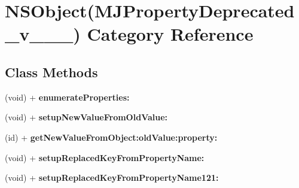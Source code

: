 \hypertarget{category_n_s_object_07_m_j_property_deprecated__v__2__5__16_08}{}\section{N\+S\+Object(M\+J\+Property\+Deprecated\+\_\+v\+\_\+\_\+\_) Category Reference}
\label{category_n_s_object_07_m_j_property_deprecated__v__2__5__16_08}
\subsection*{Class Methods}
\begin{DoxyCompactItemize}
\item 
\mbox{\label{category_n_s_object_07_m_j_property_deprecated__v__2__5__16_08_a6453f35e2678d5abd2740af400275c66}} 
(void) + {\bfseries enumerate\+Properties\+:}
\item 
\mbox{\label{category_n_s_object_07_m_j_property_deprecated__v__2__5__16_08_a7ff49498657e298c7271dcd489b183a1}} 
(void) + {\bfseries setup\+New\+Value\+From\+Old\+Value\+:}
\item 
\mbox{\label{category_n_s_object_07_m_j_property_deprecated__v__2__5__16_08_aeeb4d7f967304a42199487531aeb9b2e}} 
(id) + {\bfseries get\+New\+Value\+From\+Object\+:old\+Value\+:property\+:}
\item 
\mbox{\label{category_n_s_object_07_m_j_property_deprecated__v__2__5__16_08_ac4c5c84c6701cafc2ec95eeb301dbdee}} 
(void) + {\bfseries setup\+Replaced\+Key\+From\+Property\+Name\+:}
\item 
\mbox{\label{category_n_s_object_07_m_j_property_deprecated__v__2__5__16_08_a0e24cefd9caa4f9785a14a57a4066d61}} 
(void) + {\bfseries setup\+Replaced\+Key\+From\+Property\+Name121\+:}
\item 
\mbox{\label{category_n_s_object_07_m_j_property_deprecated__v__2__5__16_08_af5e81ac5bfae0451e3c319f99a413e65}} 

\end{DoxyCompactItemize}
